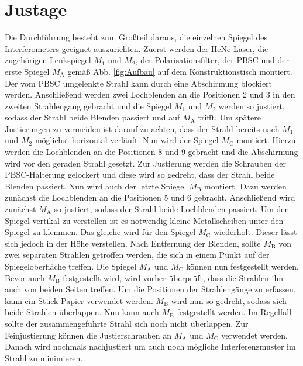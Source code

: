
\section{Justage}
\label{sec:Durchführung}
Die Durchführung besteht zum Großteil daraus, die einzelnen Spiegel des Interferometers geeignet auszurichten. %
Zuerst werden der HeNe Laser, die zugehörigen Lenkspiegel $M_\text{1}$ und $M_\text{2}$, der Polarisationsfilter, der PBSC und der erste Spiegel $M_\text{A}$ gemäß Abb. \ref{fig:Aufbau} auf dem Konstruktionstisch montiert. Der vom PBSC umgelenkte Strahl kann durch eine Abschirmung blockiert werden. Anschließend werden zwei Lochblenden an die Positionen 2 und 3 in den zweiten Strahlengang gebracht und die Spiegel $M_\text{1}$ und $M_\text{2}$ werden so justiert, sodass der Strahl beide Blenden passiert und auf $M_\text{A}$ trifft. Um spätere Justierungen zu vermeiden ist darauf zu achten, dass der Strahl bereits nach $M_\text{1}$ und $M_\text{2}$ möglichst horizontal verläuft.  Nun wird der Spiegel $M_\text{C}$ montiert. Hierzu werden die Lochblenden an die Positionen 8 und 9 gebracht und die Abschirmung wird vor den geraden Strahl gesetzt. 
Zur Justierung werden die Schrauben der PBSC-Halterung gelockert und diese wird so gedreht, dass der Strahl beide Blenden passiert. Nun wird auch der letzte Spiegel $M_\text{B}$ montiert. Dazu werden zunächst die Lochblenden an die Positionen 5 und 6 gebracht. Anschließend wird zunächst $M_\text{A}$ so justiert, sodass der Strahl beide Lochblenden passiert. Um den Spiegel vertikal zu verstellen ist es notwendig kleine Metallscheiben unter den Spiegel zu klemmen. Das gleiche wird für den Spiegel $M_\text{C}$ wiederholt. Dieser lässt sich jedoch in der Höhe verstellen. Nach Entfernung der Blenden, sollte $M_\text{B}$ von zwei separaten Strahlen getroffen werden, die sich in einem Punkt auf der Spiegeloberfläche treffen.
Die Spiegel $M_\text{A}$ und $M_\text{C}$ können nun festgestellt werden. Bevor auch $M_\text{B}$ festgestellt wird, wird vorher überprüft, dass die Strahlen ihn auch von beiden Seiten treffen. Um die Positionen der Strahlengänge zu erfassen, kann ein Stück Papier verwendet werden. $M_\text{B}$ wird nun so gedreht, sodass sich beide Strahlen überlappen. Nun kann auch $M_\text{B}$ festgestellt werden.
Im Regelfall sollte der zusammengeführte Strahl sich noch nicht überlappen. Zur Feinjustierung können die Justierschrauben an $M_\text{A}$ und $M_\text{C}$ verwendet werden. Danach wird nochmals nachjustiert um auch noch mögliche Interferenzmuster im Strahl zu minimieren.
